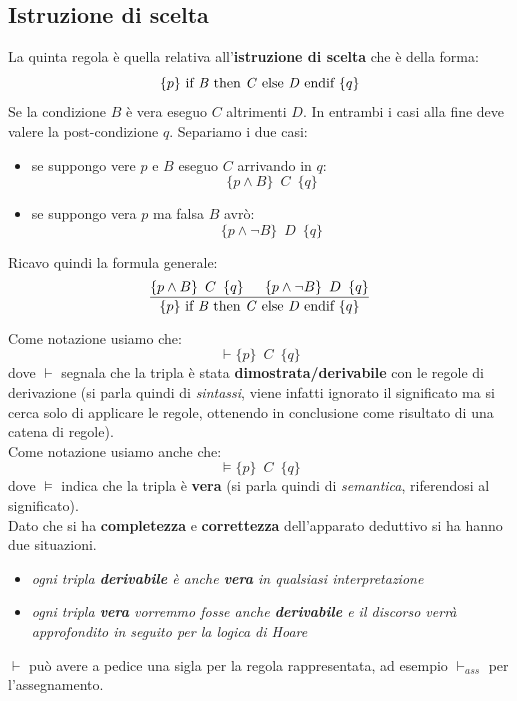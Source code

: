 \subsection{Istruzione di scelta}
\begin{definizione}
	La quinta regola è quella relativa all'\textbf{istruzione di scelta} che è
	della forma:
	\[\{p\}\mbox{ if \textit{B} then \textit{C} else \textit{D} endif }\{q\}\]
	Se la condizione $B$ è vera eseguo $C$ altrimenti $D$. In entrambi i casi
	alla fine deve valere la post-condizione $q$. Separiamo i due casi:
	\begin{itemize}
		\item se suppongo vere $p$ e $B$ eseguo $C$ arrivando in $q$:
		      \[\{p\land B\}\,\,\, C\,\,\,\{q\}\]
		\item se suppongo vera $p$ ma falsa $B$ avrò:
		      \[\{p\land \neg B\}\,\,\, D\,\,\,\{q\}\]
	\end{itemize}
	Ricavo quindi la formula generale:
	\begin{align}\label{CabbiamooseRule}
		\frac{\{p\land B\}\,\,\, C\,\,\,\{q\}\,\,\,\,\,\,\,\,\,         
		\{p\land \neg B\}\,\,\, D\,\,\,\{q\}}{\{p\}\mbox{ if \textit{B} 
		then \textit{C} else \textit{D} endif }\{q\}}                  
	\end{align}
\end{definizione} \vspace{5mm} %
\begin{shaded}
	Come notazione usiamo che:
	\[\vdash \{p\}\,\,\, C\,\,\,\{q\}\]
	dove $\vdash$
	segnala che la tripla è stata \textbf{dimostrata/derivabile} con le regole di
	derivazione (si parla quindi di \textit{sintassi}, viene infatti ignorato il
	significato ma si cerca solo di applicare le regole, ottenendo in conclusione
	come risultato di una catena di regole).\\
	Come notazione usiamo anche che:
	\[\vDash \{p\}\,\,\, C\,\,\,\{q\}\]
	dove $\vDash$
	indica che la tripla è \textbf{vera} (si parla quindi di \textit{semantica},
	riferendosi al significato).\\
	Dato che si ha \textbf{completezza} e \textbf{correttezza} dell'apparato
	deduttivo si ha hanno due situazioni.
	\begin{itemize}
		\item \textit{ogni tripla \textbf{derivabile} è anche \textbf{vera} in
		qualsiasi interpretazione}
		\item \textit{ogni tripla \textbf{vera} vorremmo fosse anche
		      \textbf{derivabile} e il discorso verrà approfondito in seguito per la
		logica di Hoare}
	\end{itemize}
	$\vdash$ può avere a pedice una sigla per la regola rappresentata, ad esempio
	$\vdash_{ass}$ per l'assegnamento.
\end{shaded}
